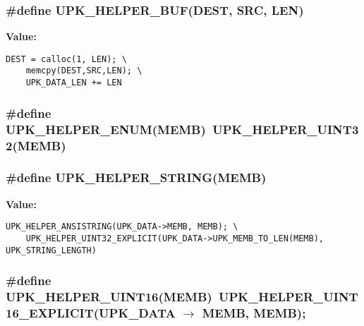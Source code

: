 \subsubsection{\setlength{\rightskip}{0pt plus 5cm}\#define UPK\_\-HELPER\_\-BUF(DEST, SRC, LEN)}\label{upk__v0__protocol_8c_b51917ba5c77eb1f045f2fdf2a140459}


\textbf{Value:}

\begin{Code}\begin{verbatim}DEST = calloc(1, LEN); \
    memcpy(DEST,SRC,LEN); \
    UPK_DATA_LEN += LEN
\end{verbatim}\end{Code}
\subsubsection{\setlength{\rightskip}{0pt plus 5cm}\#define UPK\_\-HELPER\_\-ENUM(MEMB)~UPK\_\-HELPER\_\-UINT32(MEMB)}\label{upk__v0__protocol_8c_caaf54c03fa0949fb035a1a044be1959}


\subsubsection{\setlength{\rightskip}{0pt plus 5cm}\#define UPK\_\-HELPER\_\-STRING(MEMB)}\label{upk__v0__protocol_8c_23f6346a3867d667c0f59c93c1a61613}


\textbf{Value:}

\begin{Code}\begin{verbatim}UPK_HELPER_ANSISTRING(UPK_DATA->MEMB, MEMB); \
    UPK_HELPER_UINT32_EXPLICIT(UPK_DATA->UPK_MEMB_TO_LEN(MEMB), UPK_STRING_LENGTH)
\end{verbatim}\end{Code}
\subsubsection{\setlength{\rightskip}{0pt plus 5cm}\#define UPK\_\-HELPER\_\-UINT16(MEMB)~UPK\_\-HELPER\_\-UINT16\_\-EXPLICIT(UPK\_\-DATA $\rightarrow$ MEMB, MEMB);}\label{upk__v0__protocol_8c_1cddd8e5fdc0ee74ad61e526afe59d8e}


